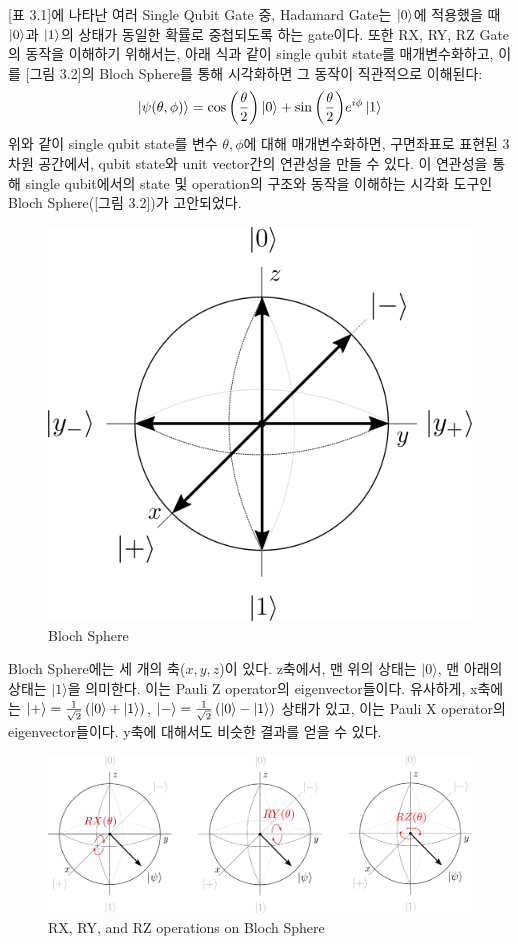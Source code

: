 [표 3.1]에 나타난 여러 Single Qubit Gate 중, Hadamard Gate는 \(\ket{0}\)에 적용했을 때 \(\ket 0\)과 \(\ket 1\)의 상태가 동일한 확률로 중첩되도록 하는 gate이다. 또한 RX, RY, RZ Gate의 동작을 이해하기 위해서는, 아래 식과 같이 single qubit state를 매개변수화하고, 이를 [그림 3.2]의 Bloch Sphere를 통해 시각화하면 그 동작이 직관적으로 이해된다:
\[
    \ket{\psi(\theta, \phi)} = \cos{\left({\theta \over 2}\right)}\ket 0 + \sin{\left({\theta \over 2}\right)}e^{i\phi} \ket 1
\]
위와 같이 single qubit state를 변수 \(\theta, \phi\)에 대해 매개변수화하면, 구면좌표로 표현된 3차원 공간에서, qubit state와 unit vector간의 연관성을 만들 수 있다. 이 연관성을 통해 single qubit에서의 state 및 operation의 구조와 동작을 이해하는 시각화 도구인 Bloch Sphere([그림 3.2])가 고안되었다.
\begin{figure}[htb!]
    \centering
    \includegraphics[width=0.5\linewidth]{figs/bloch_sphere.png}
    \caption{Bloch Sphere}
    \label{fig:bloch-sphere}
\end{figure}

\noindent Bloch Sphere에는 세 개의 축($x, y, z$)이 있다. z축에서, 맨 위의 상태는 $|0\rangle$, 맨 아래의 상태는 $|1\rangle$을 의미한다. 이는 Pauli Z operator의 eigenvector들이다. 유사하게, x축에는 $|+\rangle = {1\over \sqrt 2}\left(|0\rangle + |1\rangle\right)$, $|-\rangle = {1\over \sqrt 2}\left(|0\rangle - |1\rangle\right)$ 상태가 있고, 이는 Pauli X operator의 eigenvector들이다. y축에 대해서도 비슷한 결과를 얻을 수 있다.
\begin{figure}[htb!]
    \centering
    \includegraphics[width=1.0\linewidth]{figs/RXRYRZ.png}
    \caption{RX, RY, and RZ operations on Bloch Sphere}
    \label{fig:RX RY RZ}
\end{figure}

